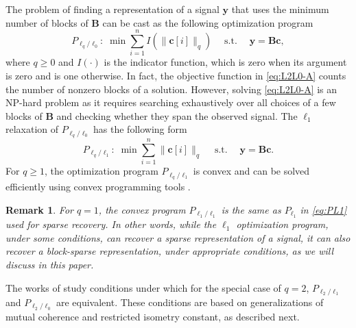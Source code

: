 \documentclass[10pt,twocolumn,twoside] {IEEEtran}
\newtheorem{remark}{Remark}
\begin{document}
The problem of finding a representation of a signal ${\boldsymbol{y}}$ that uses the minimum number of blocks of ${\boldsymbol{B}}$ can be cast as the following optimization program
\begin{equation}
\label{eq:L2L0-A}
P_{\ell_q/\ell_0}: \; \min \sum_{i=1}^{n}{I(\| {\boldsymbol{c}}[i] \|_q)} \quad {\operatorname{s. t.}} \quad {\boldsymbol{y}} = {\boldsymbol{B}} {\boldsymbol{c}},
\end{equation}
where $q \geq 0$ and $I(\cdot)$ is the indicator function, which is zero when its argument is zero and is one otherwise. In fact, the objective function in \eqref{eq:L2L0-A} counts the number of nonzero blocks of a solution. However, solving  \eqref{eq:L2L0-A} is an NP-hard problem as it requires searching exhaustively over all choices of a few blocks of ${\boldsymbol{B}}$ and checking whether they span the observed signal. The $\ell_1$ relaxation of $P_{\ell_q/\ell_0}$ has the following form
\begin{equation}
\label{eq:L2L1-A}
P_{\ell_q/\ell_1}: \; \min \sum_{i=1}^{n}{\| {\boldsymbol{c}}[i] \|_q} \quad {\operatorname{s. t.}} \quad {\boldsymbol{y}} = {\boldsymbol{B}} {\boldsymbol{c}}.
\end{equation}
For $q \geq 1$, the optimization program $P_{\ell_q/\ell_1}$ is convex and can be solved efficiently using convex programming tools \cite{BoydVandenberghe04}. 
\vspace{1mm}
\begin{remark}
For $q=1$, the convex program $P_{\ell_1/\ell_1}$ is the same as $P_{\ell_1}$ in \eqref{eq:PL1} used for sparse recovery. In other words, while the $\ell_1$ optimization program, under some conditions, can recover a sparse representation of a signal, it can also recover a block-sparse representation, under appropriate conditions, as we will discuss in this paper. 
\end{remark}
\vspace{1mm}

The works of \cite{Stojnic:TSP09, Eldar:TSP10, Eldar:TIT09} study conditions under which for the special case of $q=2$, $P_{\ell_2/\ell_1}$ and $P_{\ell_2/\ell_0}$ are equivalent.
These conditions are based on generalizations of mutual coherence and restricted isometry constant, as described next.
\end{document}
